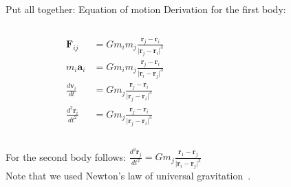 \documentclass[\classoption]{beamer}
\begin{document}
\begin{frame}{Put all together: Equation of motion}
Derivation for the first body:
\begin{columns}
\begin{column}{0.5\textwidth}
\begin{align*}
\mathbf{F}_{ij}&=G m_i m_j \frac{\mathbf{r}_j-\mathbf{r}_i}{\vert \mathbf{r}_j-\mathbf{r}_i \vert^3}  \\
m_i \mathbf{a}_i &= G m_i m_j \frac{\mathbf{r}_j-\mathbf{r}_i}{\vert \mathbf{r}_i-\mathbf{r}_j \vert^3} \\
\frac{d \mathbf{v}_i}{dt} & = G m_j \frac{\mathbf{r}_j-\mathbf{r}_i}{\vert \mathbf{r}_j-\mathbf{r}_i \vert^3} \\
\frac{d^2 \mathbf{r}_i}{dt^2} & = G m_j \frac{\mathbf{r}_j-\mathbf{r}_i}{\vert \mathbf{r}_j-\mathbf{r}_i \vert^3}
\end{align*}
\end{column}
\begin{column}{0.5\textwidth}  %
    \begin{center}
     \end{center}
\end{column}
\end{columns} 
\vspace{0.5cm}
For the second body follows:
$\frac{d^2 \mathbf{r}_j}{dt^2}  = G m_j \frac{\mathbf{r}_1-\mathbf{r}_j}{\vert \mathbf{r}_i-\mathbf{r}_j \vert^3}$ \\
\vspace{0.5cm}
Note that we used Newton's law of universal gravitation~\cite{newton1833philosophiae}.

\end{frame}
\end{document}
